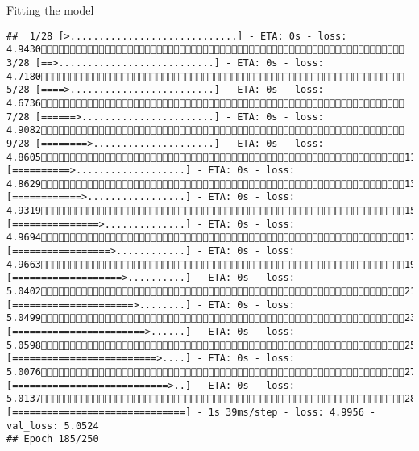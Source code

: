 \documentclass[
  ignorenonframetext,
]{beamer}
\begin{document}
\begin{frame}[fragile]{Fitting the model}
\begin{verbatim}
##  1/28 [>.............................] - ETA: 0s - loss: 4.9430 3/28 [==>...........................] - ETA: 0s - loss: 4.7180 5/28 [====>.........................] - ETA: 0s - loss: 4.6736 7/28 [======>.......................] - ETA: 0s - loss: 4.9082 9/28 [========>.....................] - ETA: 0s - loss: 4.860511/28 [==========>...................] - ETA: 0s - loss: 4.862913/28 [============>.................] - ETA: 0s - loss: 4.931915/28 [===============>..............] - ETA: 0s - loss: 4.969417/28 [=================>............] - ETA: 0s - loss: 4.966319/28 [===================>..........] - ETA: 0s - loss: 5.040221/28 [=====================>........] - ETA: 0s - loss: 5.049923/28 [=======================>......] - ETA: 0s - loss: 5.059825/28 [=========================>....] - ETA: 0s - loss: 5.007627/28 [===========================>..] - ETA: 0s - loss: 5.013728/28 [==============================] - 1s 39ms/step - loss: 4.9956 - val_loss: 5.0524
## Epoch 185/250

\end{verbatim}
\end{frame}
\end{document}

